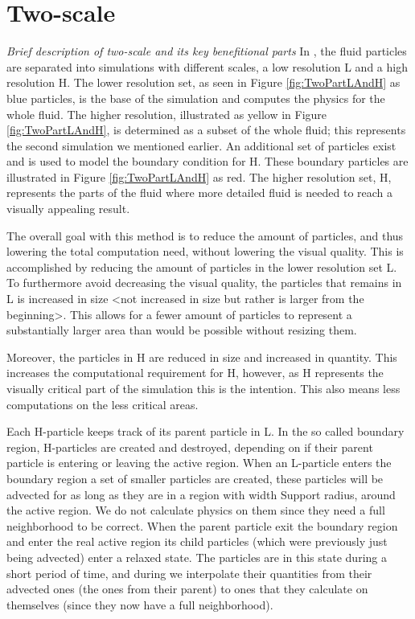 \documentclass[../../main.tex]{subfiles}
\begin{document}
\section{Two-scale}
\textit{Brief description of two-scale and its key benefitional parts}
In \cite{solenthaler2011two}, the fluid particles are separated into simulations with different scales, a low resolution L and a high resolution H. The lower resolution set, as seen in Figure \ref{fig:TwoPartLAndH} as blue particles, is the base of the simulation and computes the physics for the whole fluid. The higher resolution, illustrated as yellow in Figure \ref{fig:TwoPartLAndH}, is determined as a subset of the whole fluid; this represents the second simulation we mentioned earlier. An additional set of particles exist and is used to model the boundary condition for H. These boundary particles are illustrated in Figure \ref{fig:TwoPartLAndH} as red. The higher resolution set, H, represents the parts of the fluid where more detailed fluid is needed to reach a visually appealing result.

The overall goal with this method is to reduce the amount of particles, and thus lowering the total computation need, without lowering the visual quality. This is accomplished by reducing the amount of particles in the lower resolution set L. To furthermore avoid decreasing the visual quality, the particles that remains in L is increased in size <not increased in size but rather is larger from the beginning>. This allows for a fewer amount of particles to represent a substantially larger area than would be possible without resizing them. 

Moreover, the particles in H are reduced in size and increased in quantity. This increases the computational requirement for H, however, as H represents the visually critical part of the simulation this is the intention. This also means less computations on the less critical areas.

Each H-particle keeps track of its parent particle in L. In the so called boundary region, H-particles are created and destroyed, depending on if their parent particle is entering or leaving the active region. When an L-particle enters the boundary region a set of smaller particles are created, these particles will be advected for as long as they are in a region with width Support radius, around the active region. We do not calculate physics on them since they need a full neighborhood to be correct. When the parent particle exit the boundary region and enter the real active region its child particles (which were previously just being advected) enter a relaxed state. The particles are in this state during a short period of time, and during we interpolate their quantities from their advected ones (the ones from their parent) to ones that they calculate on themselves (since they now have a full neighborhood). 
\end{document}
